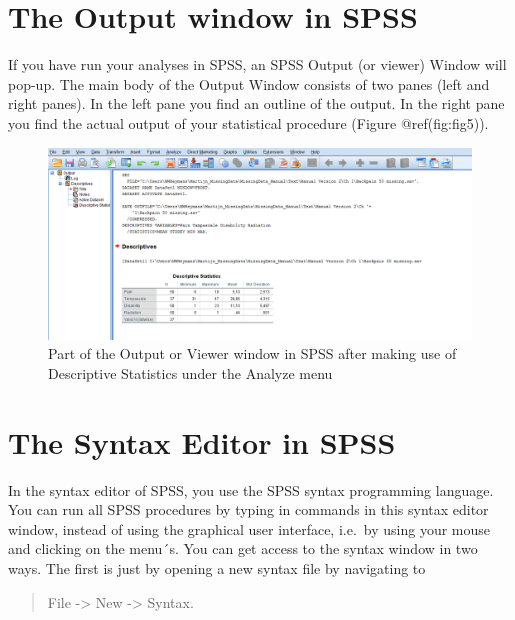 \documentclass[
]{book}
\begin{document}
\hypertarget{the-output-window-in-spss}{%
\section{The Output window in SPSS}\label{the-output-window-in-spss}}

If you have run your analyses in SPSS, an SPSS Output (or viewer) Window
will pop-up. The main body of the Output Window consists of two panes
(left and right panes). In the left pane you find an outline of the
output. In the right pane you find the actual output of your statistical
procedure (Figure @ref(fig:fig5)).

\begin{figure}

{\centering \includegraphics[width=0.95\linewidth]{images/fig1.5} 

}

\caption{Part of the Output or Viewer window in SPSS after making use of Descriptive Statistics under the Analyze menu}\label{fig:fig5}
\end{figure}

\hypertarget{the-syntax-editor-in-spss}{%
\section{The Syntax Editor in SPSS}\label{the-syntax-editor-in-spss}}

In the syntax editor of SPSS, you use the SPSS syntax programming
language. You can run all SPSS procedures by typing in commands in this
syntax editor window, instead of using the graphical user interface,
i.e.~by using your mouse and clicking on the menu´s. You can get access
to the syntax window in two ways. The first is just by opening a new
syntax file by navigating to

\begin{quote}
File -\textgreater{} New -\textgreater{} Syntax.
\end{quote}
\end{document}
